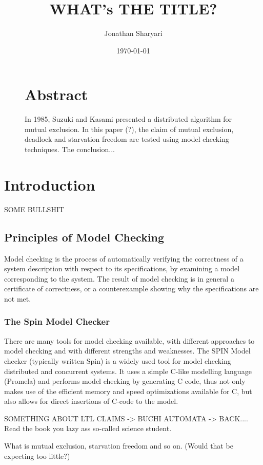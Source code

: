 \documentclass[a4paper,12pt]{article}
\title{\textbf{WHAT's THE TITLE?}}
\author{Jonathan Sharyari}  %
\date{\today}
\begin{document}
\maketitle

\begin{figure}
\section*{\large Abstract}
In 1985, Suzuki and Kasami presented a distributed algorithm for mutual exclusion. In this paper (?), the claim of mutual exclusion, deadlock and starvation freedom are tested using model checking techniques. The conclusion...
\end{figure}
\newpage

\section{Introduction}
SOME BULLSHIT


\subsection{Principles of Model Checking}
Model checking is the process of automatically verifying the correctness of a system description with respect to its specifications, by examining a model corresponding to the system. The result of model checking is in general a certificate of correctness, or a counterexample showing why the specifications are not met.

\subsubsection{The Spin Model Checker}
There are many tools for model checking available, with different approaches to model checking and with different strengths and weaknesses. The SPIN Model checker (typically written Spin) is a widely used tool for model checking distributed and concurrent systems. It uses a simple C-like modelling language (Promela) and performs model checking by generating C code, thus not only makes use of the efficient memory and speed optimizations available for C, but also allows for direct insertions of C-code to the model.

SOMETHING ABOUT LTL CLAIMS -> BUCHI AUTOMATA -> BACK.... Read the book you lazy ass so-called science student.



What is mutual exclusion, starvation freedom and so on. (Would that be expecting too little?)
\end{document}
